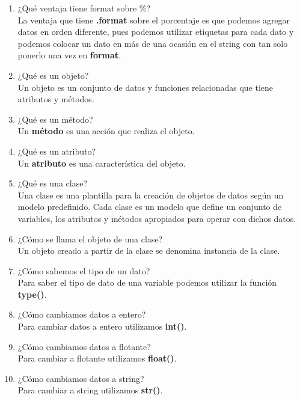 \documentclass[letterpaper, 12pt, oneside]{article}%
\begin{document}
\begin{enumerate}
		\item ¿Qué ventaja tiene format sobre \%? \\ La ventaja que tiene \textbf{.format} sobre el porcentaje es que podemos agregar datos en orden diferente, pues podemos utilizar etiquetas para cada dato y podemos colocar un dato en más de una ocasión en el string con tan solo ponerlo una vez en \textbf{format}.
		\item ¿Qué es un objeto? \\ Un objeto es un conjunto de datos y funciones relacionadas que tiene atributos y métodos.
		\item ¿Qué es un método? \\ Un \textbf{método} es una acción que realiza el objeto.
		\item ¿Qué es un atributo? \\ Un \textbf{atributo} es una característica del objeto.
		\item ¿Qué es una clase? \\ Una clase es una plantilla para la creación de objetos de datos según un modelo predefinido. Cada clase es un modelo que define un conjunto de variables, los atributos y métodos apropiados para operar con dichos datos.
		\item ¿Cómo se llama el objeto de una clase? \\ Un objeto creado a partir de la clase se denomina instancia de la clase.
		\item ¿Cómo sabemos el tipo de un dato? \\ Para saber el tipo de dato de una variable podemos utilizar la función \textbf{type()}.
		\item  ¿Cómo cambiamos datos a entero? \\ Para cambiar datos a entero utilizamos \textbf{int()}.
		\item ¿Cómo cambiamos datos a flotante? \\ Para cambiar a flotante utilizamos \textbf{float()}.
		\item ¿Cómo cambiamos datos a string? \\ Para cambiar a string utilizamos \textbf{str()}.
		
	\end{enumerate}
\end{document}
